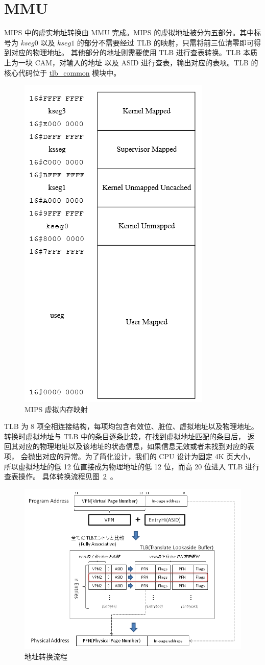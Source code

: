 \documentclass[blue,normal,cn,hide]{elegantbook}
\begin{document}
\section{MMU}
MIPS 中的虚实地址转换由 MMU 完成。MIPS 的虚拟地址被分为五部分。其中标号为 $kseg0$ 
以及 $kseg1$ 的部分不需要经过 TLB 的映射，只需将前三位清零即可得到对应的物理地址。
其他部分的地址则需要使用 TLB 进行查表转换。TLB 本质上为一块 CAM，对输入的地址
以及 ASID 进行查表，输出对应的表项。TLB 的核心代码位于 \href{https://github.com/name1e5s/Sirius/blob/SiriusG/tlb\_common.sv}{tlb\_common} 
模块中。

\begin{figure}[htpb]
    \centering
    \includegraphics[width=.4\textwidth]{figures/VirtualAddress}
    \caption{MIPS 虚拟内存映射}
    \label{fig:VirtualAddress}
\end{figure}


TLB 为 8 项全相连接结构，每项均包含有效位、脏位、虚拟地址以及物理地址。
转换时虚拟地址与 TLB 中的条目逐条比较，在找到虚拟地址匹配的条目后，
返回其对应的物理地址以及该地址的状态信息，如果信息无效或者未找到对应的表项，
会抛出对应的异常。为了简化设计，我们的 CPU 设计为固定 4K 页大小，
所以虚拟地址的低 12 位直接成为物理地址的低 12 位，而高 20 位进入 TLB 进行查表操作。
具体转换流程见图~\ref{fig:TLBTran}~。

\begin{figure}[htpb]
    \centering
    \includegraphics[width=.9\textwidth]{figures/TLBTran}
    \caption{地址转换流程}
    \label{fig:TLBTran}
\end{figure}
\end{document}
